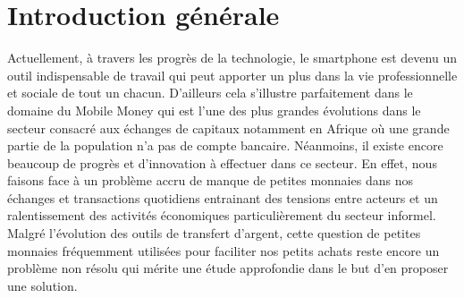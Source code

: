 
\chapter*{Introduction générale}
Actuellement, à travers les progrès de la technologie, le smartphone est devenu un outil
indispensable de travail qui peut apporter un plus dans la vie professionnelle et sociale de tout
un chacun. D’ailleurs cela s’illustre parfaitement dans le domaine du Mobile Money qui est
l’une des plus grandes évolutions dans le secteur consacré aux échanges de capitaux notamment
en Afrique où une grande partie de la population n'a pas de compte bancaire.
Néanmoins, il existe encore beaucoup de progrès et d’innovation à effectuer dans ce secteur.
En effet, nous faisons face à un problème accru de manque de petites monnaies dans nos
échanges et transactions quotidiens entrainant des tensions entre acteurs et un ralentissement
des activités économiques particulièrement du secteur informel. Malgré l’évolution des outils
de transfert d’argent, cette question de petites monnaies fréquemment utilisées pour faciliter
nos petits achats reste encore un problème non résolu qui mérite une étude approfondie dans le
but d’en proposer une solution.